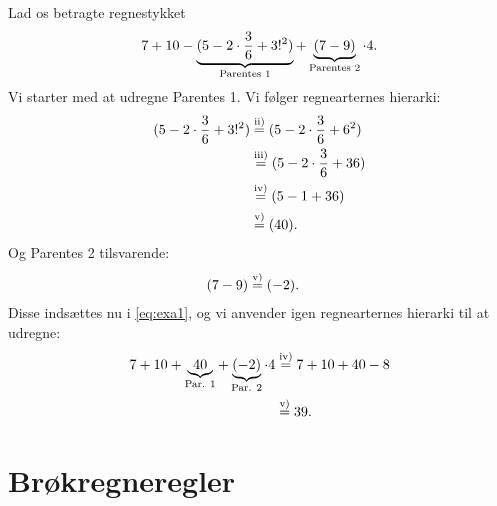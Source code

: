 \documentclass[12pt]{article}
\begin{document}
\begin{exa}
Lad os betragte regnestykket
\begin{align}\label{eq:exa1}
7+10-\underbrace{(5-2\cdot \frac{3}{6}+3!^2)}_{\textnormal{Parentes 1}}+\underbrace{(7-9)}_{\textnormal{Parentes 2}}\cdot 4.
\end{align}
Vi starter med at udregne Parentes 1. Vi følger regnearternes hierarki:
\begin{align*}
(5-2\cdot \frac{3}{6}+3!^2) &\overset{\textnormal{ii)}}{=} (5-2\cdot \frac{3}{6}+6^2)\\
							&\overset{\textnormal{iii)}}{=} (5-2\cdot \frac{3}{6}+36)\\
							&\overset{\textnormal{iv)}}{=} (5-1+36)\\
							&\overset{\textnormal{v)}}{=} (40).
\end{align*}
Og Parentes 2 tilsvarende:
\begin{align*}
(7-9) &\overset{\textnormal{v)}}{=} (-2).
\end{align*}
Disse indsættes nu i \eqref{eq:exa1}, og vi anvender igen regnearternes hierarki til at udregne:
\begin{align*}
7+10+\underbrace{40}_{\textnormal{Par. 1}} + \underbrace{(-2)}_{\textnormal{Par. 2}}\cdot 4 &\overset{\textnormal{iv)}}{=} 7+10+40 -8 \\
&\overset{\textnormal{v)}}{=} 39.
\end{align*}
\end{exa}


\section*{Brøkregneregler}
\end{document}
